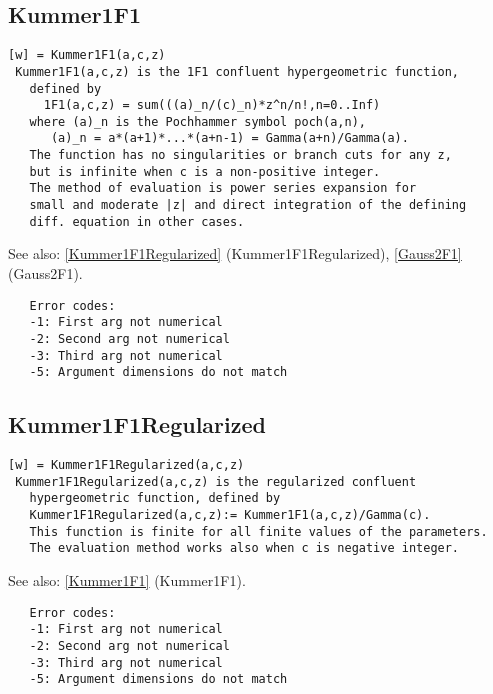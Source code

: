 \documentclass[a4paper]{article}
\begin{document}
\subsection{Kummer1F1\label{Kummer1F1}}

\begin{tscreen}
\begin{verbatim}
[w] = Kummer1F1(a,c,z)
 Kummer1F1(a,c,z) is the 1F1 confluent hypergeometric function,
   defined by
     1F1(a,c,z) = sum(((a)_n/(c)_n)*z^n/n!,n=0..Inf)
   where (a)_n is the Pochhammer symbol poch(a,n),
      (a)_n = a*(a+1)*...*(a+n-1) = Gamma(a+n)/Gamma(a).
   The function has no singularities or branch cuts for any z,
   but is infinite when c is a non-positive integer.
   The method of evaluation is power series expansion for
   small and moderate |z| and direct integration of the defining
   diff. equation in other cases.
\end{verbatim}

See also: \ref{Kummer1F1Regularized} {(Kummer1F1Regularized)}, \ref{Gauss2F1} {(Gauss2F1)}.
\begin{verbatim}
   Error codes:
   -1: First arg not numerical
   -2: Second arg not numerical
   -3: Third arg not numerical
   -5: Argument dimensions do not match
\end{verbatim}
\end{tscreen}





\subsection{Kummer1F1Regularized\label{Kummer1F1Regularized}}

\begin{tscreen}
\begin{verbatim}
[w] = Kummer1F1Regularized(a,c,z)
 Kummer1F1Regularized(a,c,z) is the regularized confluent
   hypergeometric function, defined by
   Kummer1F1Regularized(a,c,z):= Kummer1F1(a,c,z)/Gamma(c).
   This function is finite for all finite values of the parameters.
   The evaluation method works also when c is negative integer.
\end{verbatim}

See also: \ref{Kummer1F1} {(Kummer1F1)}.
\begin{verbatim}
   Error codes:
   -1: First arg not numerical
   -2: Second arg not numerical
   -3: Third arg not numerical
   -5: Argument dimensions do not match
\end{verbatim}
\end{tscreen}
\end{document}
